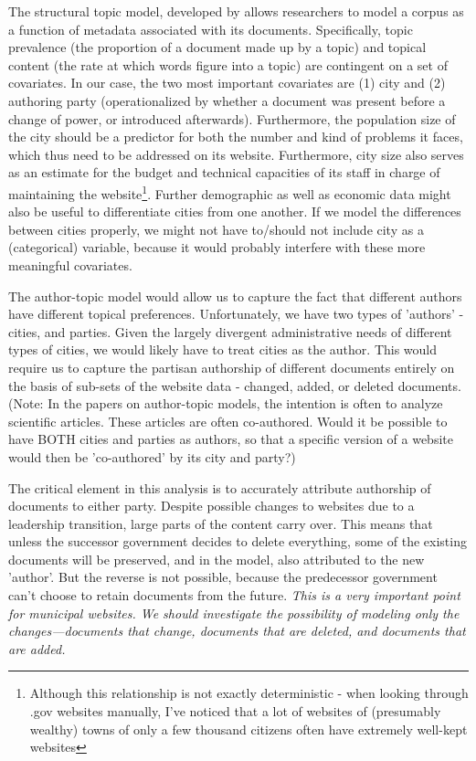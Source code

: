 \documentclass[11pt]{article}
\begin{document}
The structural topic model, developed by \cite{Roberts2016a} allows researchers to model a corpus as a function of metadata associated with its documents. Specifically, topic prevalence (the proportion of a document made up by a topic) and topical content (the rate at which words figure into a topic) are contingent on a set of covariates. In our case, the two most important covariates are (1) city and (2) authoring party (operationalized by whether a document was present before a change of power, or introduced afterwards). Furthermore, the population size of the city should be a predictor for both the number and kind of problems it faces, which thus need to be addressed on its website. Furthermore, city size also serves as an estimate for the budget and technical capacities of its staff in charge of maintaining the website\footnote{Although this relationship is not exactly deterministic - when looking through .gov websites manually, I've noticed that a lot of websites of (presumably wealthy)  towns of only a few thousand citizens often have extremely well-kept websites}.  Further demographic as well as economic data might also be useful to differentiate cities from one another. If we model the differences between cities properly, we might not have to/should not include city as a (categorical) variable, because it would probably interfere with these more meaningful covariates.

The author-topic model \citep{Rosen-Zvi2004} would allow us to capture the fact that different authors have different topical preferences. Unfortunately, we have two types of 'authors' - cities, and parties. Given the largely divergent administrative needs of different types of cities, we would likely have to treat cities as the author. This would require us to capture the partisan authorship of different documents entirely on the basis of sub-sets of the website data - changed, added, or deleted documents. (Note: In the papers on author-topic models, the intention is often to analyze scientific articles. These articles are often co-authored. Would it be possible to have BOTH cities and parties as authors, so that a specific version of a website would then be 'co-authored' by its city and party?)

The critical element in this analysis is to accurately attribute authorship of documents to either party. Despite possible changes to websites due to a leadership transition, large parts of the content carry over. This means that unless the successor government decides to delete everything, some of the existing documents will be preserved, and in the model, also attributed to the new 'author'. But the reverse is not possible, because the predecessor government can't choose to retain documents from the future. {\em  This is a very important point for municipal websites. We should investigate the possibility of modeling only the changes---documents that change, documents that are deleted, and documents that are added. }
\end{document}
